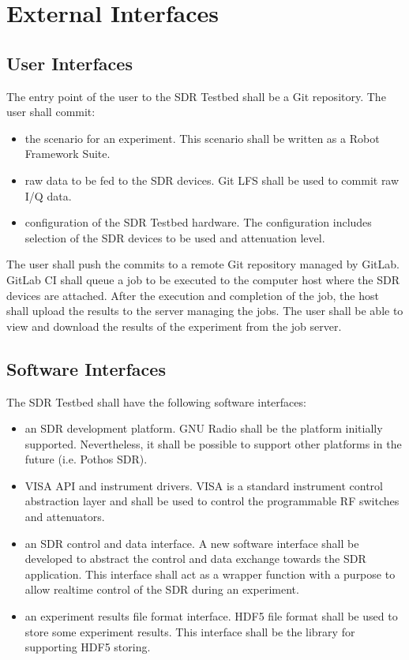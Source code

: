 \documentclass[english,titlepage,a4paper]{report}
\begin{document}
\chapter{External Interfaces}
\section{User Interfaces}

The entry point of the user to the \gls{SDR Testbed} shall be a \gls{Git} repository.
The user shall commit:
\begin{itemize}
\item the \gls{scenario} for an \gls{experiment}.
  This \gls{scenario} shall be written as a \gls{Robot Framework} Suite.
\item raw data to be fed to the \acrshort{SDR} devices.
  \gls{Git LFS} shall be used to commit raw \gls{I/Q data}.
\item configuration of the \gls{SDR Testbed} hardware.
  The configuration includes selection of the \acrshort{SDR} devices to be used and attenuation level.
\end{itemize}
The user shall push the commits to a remote \gls{Git} repository managed by \gls{GitLab}.
\gls{GitLab} \acrshort{CI} shall queue a \gls{job} to be executed to the computer host where the \acrshort{SDR} devices are attached.
After the execution and completion of the \gls{job}, the host shall upload the results to the server managing the \glspl{job}.
The user shall be able to view and download the results of the \gls{experiment} from the \gls{job} server.

\newpage
\section{Software Interfaces}

The \gls{SDR Testbed} shall have the following software interfaces:
\begin{itemize}
\item an \gls{SDR development platform}.
  \gls{GNU Radio} shall be the platform initially supported.
  Nevertheless, it shall be possible to support other platforms in the future (i.e. \gls{Pothos SDR}).
\item \gls{VISA} \acrshort{API} and instrument drivers.
  \gls{VISA} is a standard instrument control abstraction layer and shall be used to control the programmable \acrshort{RF} switches and attenuators.
\item an \acrshort{SDR} control and data interface.
  A new software interface shall be developed to abstract the control and data exchange towards the \gls{SDR application}.
  This interface shall act as a wrapper function with a purpose to allow realtime control of the \acrshort{SDR} during an \gls{experiment}.
\item an \gls{experiment} results file format interface.
  \gls{HDF5} file format shall be used to store some \gls{experiment} results.
  This interface shall be the library for supporting \gls{HDF5} storing.
\end{itemize}
\end{document}
